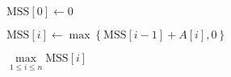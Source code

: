 
\begin{algorithm}[H]
  \begin{algorithmic}[1]
      \State $\text{MSS}[0] \gets 0$

      \hStatex
	\State $\text{MSS}[i] \gets \max\left\{\text{MSS}[i-1] + A[i], 0\right\}$
      \EndFor

      \hStatex
      \State \Return $\max\limits_{1 \le i \le n} \text{MSS}[i]$
    \EndProcedure
  \end{algorithmic}
\end{algorithm}
